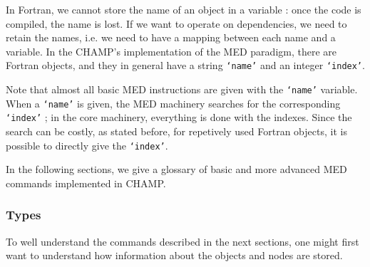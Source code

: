 \documentclass[a4paper,11pt]{article}
\begin{document}
In Fortran, we cannot store the name of an object in a variable : once the code is compiled, the name is lost.
If we want to operate on dependencies, we need to retain the names, i.e. we need to have a mapping between each name and a variable.
In the CHAMP's implementation of the MED paradigm, there are Fortran objects, and they in general have a string {\tt `name'} and an integer {\tt `index'}.

Note that almost all basic MED instructions are given with the {\tt `name'} variable.
When a {\tt `name'} is given, the MED machinery searches for the corresponding {\tt `index'} ; in the core machinery, everything is done with the indexes.
Since the search can be costly, as stated before, for repetively used Fortran objects, it is possible to directly give the {\tt `index'}.

In the following sections, we give a glossary of basic and more advanced MED commands implemented in CHAMP.

\subsubsection{Types}
\label{subsub:types}

To well understand the commands described in the next sections, one might first want to understand how information about the objects and nodes are stored.
\end{document}
